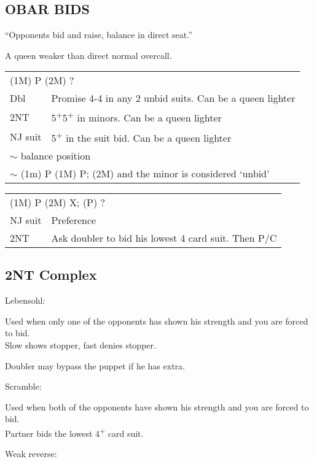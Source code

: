 \documentclass{article}
\newcommand{\nt}{\relsize{-1}NT\relsize{1}}
\newcommand{\up}{\textsuperscript{+}}
\begin{document}
\subsection{OBAR BIDS}

``Opponents bid and raise, balance in direct seat.''

A queen weaker than direct normal overcall.

\medskip

\begin{tabular}{|l|p{6.5cm}}
	\multicolumn{2}{l}{(1M) P (2M) ?} \\
    Dbl & Promise 4-4 in any 2 unbid suits. Can be a queen lighter \\
    2\nt & 5\up{}5\up{} in minors. Can be a queen lighter \\
    NJ suit & 5\up{} in the suit bid. Can be a queen lighter \\
		\multicolumn{2}{l}{$\sim$ balance position} \\
		\multicolumn{2}{l}{$\sim$ (1m) P (1M) P; (2M) and the minor is considered `unbid'}
\end{tabular}

\medskip

\begin{tabular}{|l|p{6.5cm}}
	\multicolumn{2}{l}{(1M) P (2M) X; (P) ?} \\
    NJ suit & Preference \\
    2\nt & Ask doubler to bid his lowest 4 card suit. Then P/C \\
\end{tabular}

\subsection{2\nt{} Complex}
	Lebensohl:

	Used when only one of the opponents has shown his strength and you are forced to bid. \\
	Slow shows stopper, fast denies stopper.

	Doubler may bypass the puppet if he has extra.

	\medskip

	Scramble:

	Used when both of the opponents have shown his strength and you are forced to bid. \\
	Partner bids the lowest 4\up{} card suit.

	\medskip

	Weak reverse:
\end{document}
